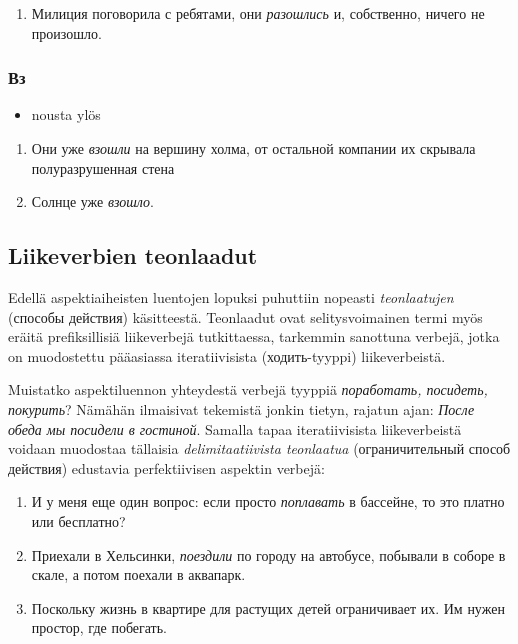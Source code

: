 \documentclass[]{scrartcl}
\providecommand{\tightlist}{%
  \setlength{\itemsep}{0pt}\setlength{\parskip}{0pt}}
\begin{document}
\begin{enumerate}
\def\labelenumi{(\arabic{enumi})}
\setcounter{enumi}{443}
\tightlist
\item
  Милиция поговорила с ребятами, они \emph{разошлись} и, собственно,
  ничего не произошло.
\end{enumerate}

\subsubsection{Вз}\label{ux432ux437}

\begin{itemize}
\tightlist
\item
  nousta ylös
\end{itemize}

\begin{enumerate}
\def\labelenumi{(\arabic{enumi})}
\setcounter{enumi}{444}
\tightlist
\item
  Они уже \emph{взошли} на вершину холма, от остальной компании их
  скрывала полуразрушенная стена
\item
  Солнце уже \emph{взошло}.
\end{enumerate}

\subsection{Liikeverbien teonlaadut}\label{liikeverbien-teonlaadut}

Edellä aspektiaiheisten luentojen lopuksi puhuttiin nopeasti
\emph{teonlaatujen} (способы действия) käsitteestä. Teonlaadut ovat
selitysvoimainen termi myös eräitä prefiksillisiä liikeverbejä
tutkittaessa, tarkemmin sanottuna verbejä, jotka on muodostettu
pääasiassa iteratiivisista (ходить-tyyppi) liikeverbeistä.

Muistatko aspektiluennon yhteydestä verbejä tyyppiä \emph{поработать,
посидеть, покурить}? Nämähän ilmaisivat tekemistä jonkin tietyn, rajatun
ajan: \emph{После обеда мы посидели в гостиной}. Samalla tapaa
iteratiivisista liikeverbeistä voidaan muodostaa tällaisia
\emph{delimitaatiivista teonlaatua} (ограничительный способ действия)
edustavia perfektiivisen aspektin verbejä:

\begin{enumerate}
\def\labelenumi{(\arabic{enumi})}
\setcounter{enumi}{446}
\tightlist
\item
  И у меня еще один вопрос: если просто \emph{поплавать} в бассейне, то
  это платно или бесплатно?
\item
  Приехали в Хельсинки, \emph{поездили} по городу на автобусе, побывали
  в соборе в скале, а потом поехали в аквапарк.
\item
  Поскольку жизнь в квартире для растущих детей ограничивает их. Им
  нужен простор, где побегать.
\end{enumerate}
\end{document}
